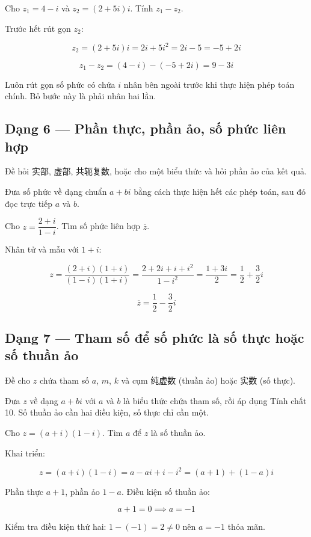 \documentclass[11pt, a4paper]{article}
\begin{document}
\begin{vidu}[{5}]
Cho $z_1 = 4 - i$ và $z_2 = (2 + 5i)i$. Tính $z_1 - z_2$.

Trước hết rút gọn $z_2$:

$$z_2 = (2 + 5i)i = 2i + 5i^2 = 2i - 5 = -5 + 2i$$

$$z_1 - z_2 = (4 - i) - (-5 + 2i) = 9 - 3i$$

 Luôn rút gọn số phức có chứa $i$ nhân bên ngoài trước khi thực hiện phép toán chính. Bỏ bước này là phải nhân hai lần.

\end{vidu}
\subsection{Dạng 6 — Phần thực, phần ảo, số phức liên hợp}

 Đề hỏi 实部, 虚部, 共轭复数, hoặc cho một biểu thức và hỏi phần ảo của kết quả.

 Đưa số phức về dạng chuẩn $a + bi$ bằng cách thực hiện hết các phép toán, sau đó đọc trực tiếp $a$ và $b$.

\begin{vidu}[{6}]
Cho $z = \dfrac{2+i}{1-i}$. Tìm số phức liên hợp $\overline{z}$.

Nhân tử và mẫu với $1 + i$:

$$z = \frac{(2+i)(1+i)}{(1-i)(1+i)} = \frac{2 + 2i + i + i^2}{1 - i^2} = \frac{1 + 3i}{2} = \frac{1}{2} + \frac{3}{2}i$$

$$\overline{z} = \frac{1}{2} - \frac{3}{2}i$$

\end{vidu}
\subsection{Dạng 7 — Tham số để số phức là số thực hoặc số thuần ảo}

 Đề cho $z$ chứa tham số $a$, $m$, $k$ và cụm 纯虚数 (thuần ảo) hoặc 实数 (số thực).

 Đưa $z$ về dạng $a + bi$ với $a$ và $b$ là biểu thức chứa tham số, rồi áp dụng Tính chất 10. Số thuần ảo cần hai điều kiện, số thực chỉ cần một.

\begin{vidu}[{7}]
Cho $z = (a + i)(1 - i)$. Tìm $a$ để $z$ là số thuần ảo.

Khai triển:

$$z = (a + i)(1 - i) = a - ai + i - i^2 = (a + 1) + (1 - a)i$$

Phần thực $a + 1$, phần ảo $1 - a$. Điều kiện số thuần ảo:

$$a + 1 = 0 \implies a = -1$$

Kiểm tra điều kiện thứ hai: $1 - (-1) = 2 \ne 0$ nên $a = -1$ thỏa mãn.

\end{vidu}
\end{document}
